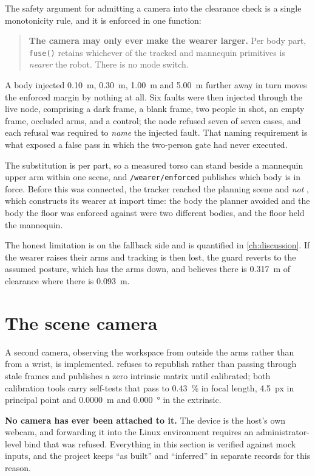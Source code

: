 The safety argument for admitting a camera into the clearance check is a
single monotonicity rule, and it is enforced in one function:

\begin{quote}
\textbf{The camera may only ever make the wearer larger.} Per body part,
\texttt{fuse()} retains whichever of the tracked and mannequin primitives is
\emph{nearer} the robot. There is no mode switch.
\end{quote}

A body injected \SI{0.10}{\metre}, \SI{0.30}{\metre}, \SI{1.00}{\metre} and
\SI{5.00}{\metre} further away in turn moves the enforced margin by nothing at
all. Six faults were then injected through the live node, comprising a dark
frame, a blank frame, two people in shot, an empty frame, occluded arms, and a
control; the node refused seven of seven cases, and each refusal was required
to \emph{name} the injected fault. That naming requirement is what exposed a
false pass in which the two-person gate had never executed.

The substitution is per part, so a measured torso can stand beside a mannequin
upper arm within one scene, and \texttt{/wearer/enforced} publishes which body
is in force. Before this was connected, the tracker reached the planning scene
and \emph{not} , which constructs its wearer at
import time: the body the planner avoided and the body the floor was enforced
against were two different bodies, and the floor held the mannequin.

The honest limitation is on the fallback side and is quantified in
\cref{ch:discussion}. If the wearer raises their arms and tracking is then
lost, the guard reverts to the assumed posture, which has the arms down, and
believes there is \SI{0.317}{\metre} of clearance where there is
\SI{0.093}{\metre}.

\section{The scene camera}

A second camera, observing the workspace from outside the arms rather than
from a wrist, is implemented.  refuses to republish
rather than passing through stale frames and publishes a zero intrinsic matrix
until calibrated; both calibration tools carry self-tests that pass to
\SI{0.43}{\percent} in focal length, \SI{4.5}{px} in principal point and
\SI{0.0000}{\metre} and \SI{0.000}{\degree} in the extrinsic.

\textbf{No camera has ever been attached to it.} The device is the host's own
webcam, and forwarding it into the Linux environment requires an
administrator-level bind that was refused. Everything in this section is
verified against mock inputs, and the project keeps ``as built'' and
``inferred'' in separate records for this reason.
